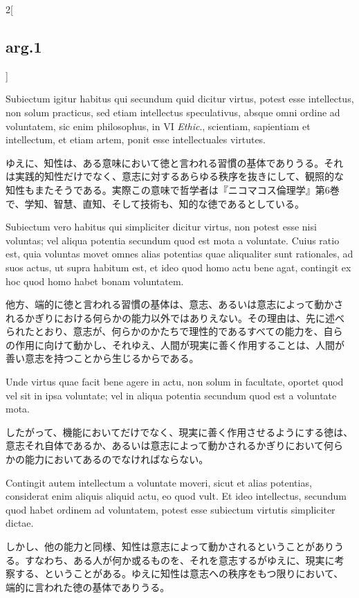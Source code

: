 \documentclass[paper=a4paper,fontsize=10pt,jafontsize=9pt,titlepage]{jlreq}
\begin{document}
\begin{paracol}{2}[\subsection{arg.1}]
\switchcolumn*

Subiectum igitur habitus qui secundum quid dicitur virtus, potest esse
intellectus, non solum practicus, sed etiam intellectus speculativus,
absque omni ordine ad voluntatem, sic enim philosophus, in VI
{\itshape Ethic}., scientiam, sapientiam et intellectum, et etiam
artem, ponit esse intellectuales virtutes.

\switchcolumn

ゆえに、知性は、ある意味において徳と言われる習慣の基体でありうる。それ
は実践的知性だけでなく、意志に対するあらゆる秩序を抜きにして、観照的な
知性もまたそうである。実際この意味で哲学者は『ニコマコス倫理学』第6巻
で、学知、智慧、直知、そして技術も、知的な徳であるとしている。

\switchcolumn*

Subiectum vero habitus qui simpliciter dicitur virtus, non potest esse
nisi voluntas; vel aliqua potentia secundum quod est mota a
voluntate. Cuius ratio est, quia voluntas movet omnes alias potentias
quae aliqualiter sunt rationales, ad suos actus, ut supra habitum est,
et ideo quod homo actu bene agat, contingit ex hoc quod homo habet
bonam voluntatem.

\switchcolumn

他方、端的に徳と言われる習慣の基体は、意志、あるいは意志によって動かさ
れるかぎりにおける何らかの能力以外ではありえない。その理由は、先に述べ
られたとおり、意志が、何らかのかたちで理性的であるすべての能力を、自ら
の作用に向けて動かし、それゆえ、人間が現実に善く作用することは、人間が
善い意志を持つことから生じるからである。

\switchcolumn*

Unde virtus quae facit bene agere in actu, non solum in facultate,
oportet quod vel sit in ipsa voluntate; vel in aliqua potentia
secundum quod est a voluntate mota.

\switchcolumn

したがって、機能においてだけでなく、現実に善く作用させるようにする徳は、
意志それ自体であるか、あるいは意志によって動かされるかぎりにおいて何ら
かの能力においてあるのでなければならない。

\switchcolumn*

Contingit autem intellectum a voluntate moveri, sicut et alias
potentias, considerat enim aliquis aliquid actu, eo quod vult. Et ideo
intellectus, secundum quod habet ordinem ad voluntatem, potest esse
subiectum virtutis simpliciter dictae.

\switchcolumn

しかし、他の能力と同様、知性は意志によって動かされるということがありう
る。すなわち、ある人が何か或るものを、それを意志するがゆえに、現実に考
察する、ということがある。ゆえに知性は意志への秩序をもつ限りにおいて、
端的に言われた徳の基体でありうる。


\end{paracol}
\end{document}
